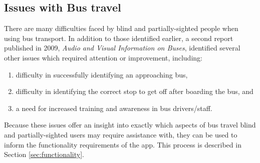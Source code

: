 \documentclass[10pt,twocolumn]{article}
\begin{document}
\subsection{Issues with Bus travel}
There are many difficulties faced by blind and partially-sighted people when using bus transport. In addition to those identified earlier, a second report published in 2009, \emph{Audio and Visual Information on Buses}, identified several other issues which required attention or improvement, including:
\begin{enumerate}
\item difficulty in successfully identifying an approaching bus,
\item difficulty in identifying the correct stop to get off after boarding the bus, and
\item a need for increased training and awareness in bus drivers/staff.
\end {enumerate}

Because these issues offer an insight into exactly which aspects of bus travel blind and partially-sighted users may require assistance with, they can be used to inform the functionality requirements of the app. This process is described in Section \ref{sec:functionality}.
\end{document}
